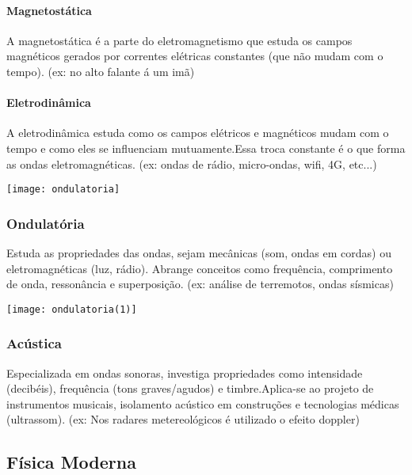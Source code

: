 \documentclass[portuguese,11pt,a4paper,oneside,openany,notitlepage]{article}
\begin{document}
	\paragraph{Magnetostática}
	A magnetostática é a parte do eletromagnetismo que estuda os campos magnéticos gerados por correntes elétricas constantes (que não mudam com o tempo). \newline (ex: no alto falante á um imã)
	\paragraph{Eletrodinâmica}
	A eletrodinâmica estuda como os campos elétricos e magnéticos mudam com o tempo e como eles se influenciam mutuamente.Essa troca constante é o que forma as ondas eletromagnéticas. \newline (ex: ondas de rádio, micro-ondas, wifi, 4G, etc...)
	
	\begin{center}
		\texttt{[image: ondulatoria]}
	\end{center}
	
	\subsubsection{Ondulatória}
	Estuda as propriedades das ondas, sejam mecânicas (som, ondas em cordas) ou eletromagnéticas (luz, rádio). Abrange conceitos como frequência, comprimento de onda, ressonância e superposição. \newline (ex: análise de terremotos, ondas sísmicas)
	
	\begin{center}
		\texttt{[image: ondulatoria(1)]}
	\end{center}
	
	\subsubsection{Acústica}
	Especializada em ondas sonoras, investiga propriedades como intensidade (decibéis), frequência (tons graves/agudos) e timbre.Aplica-se ao projeto de instrumentos musicais, isolamento acústico em construções e tecnologias médicas (ultrassom). \newline (ex: Nos radares metereológicos é utilizado o efeito doppler)
	
	\subsection{Física Moderna}
	
\end{document}
